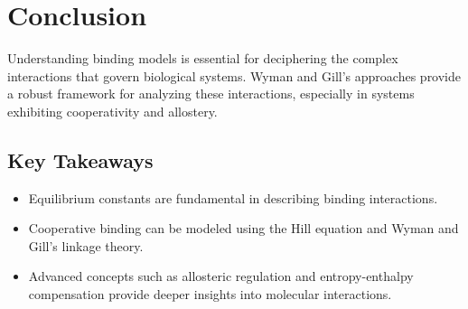 \documentclass[english,course]{lecture}
\begin{document}

\section{Conclusion}

Understanding binding models is essential for deciphering the complex interactions that govern biological systems. Wyman and Gill's approaches provide a robust framework for analyzing these interactions, especially in systems exhibiting cooperativity and allostery.

\subsection{Key Takeaways}

\begin{itemize}
    \item Equilibrium constants are fundamental in describing binding interactions.
    \item Cooperative binding can be modeled using the Hill equation and Wyman and Gill's linkage theory.
    \item Advanced concepts such as allosteric regulation and entropy-enthalpy compensation provide deeper insights into molecular interactions.
\end{itemize}

\vfill
\eject


% 
% 
\end{document}
